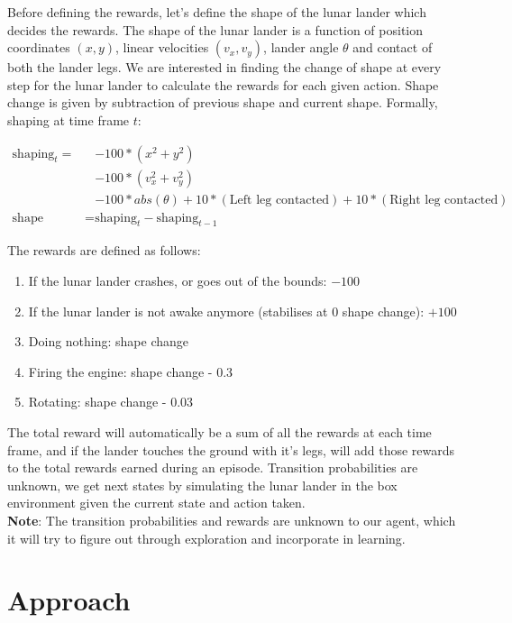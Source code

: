 \documentclass[12pt]{article}
\begin{document}
Before defining the rewards, let's define the shape of the lunar lander which decides the rewards. The shape of the lunar lander is a function of position coordinates $(x, y)$, linear velocities $(v_x, v_y)$, lander angle $\theta$ and contact of both the lander legs. We are interested in finding the change of shape at every step for the lunar lander to calculate the rewards for each given action. Shape change is given by subtraction of previous shape and current shape. Formally, shaping at time frame $t$:

\begin{align*}
\text{shaping}_{t} = &- 100*(x^2 + y^2) \\
           & - 100*(v_x^2 + v_y^2) \\
            &- 100*abs(\theta) + 10*(\text{Left leg contacted}) + 10*(\text{Right leg contacted}) \\
\text{shape change} = & \text{shaping}_t - \text{shaping}_{t-1}
\end{align*}

The rewards are defined as follows:

\begin{enumerate}
\item If the lunar lander crashes, or goes out of the bounds: $-100$
\item If the lunar lander is not awake anymore (stabilises at 0 shape change): $+100$
\item Doing nothing: shape change 
\item Firing the engine: shape change - 0.3
\item Rotating: shape change - 0.03
\end{enumerate}

The total reward will automatically be a sum of all the rewards at each time frame, and if the lander touches the ground with it's legs, will add those rewards to the total rewards earned during an episode. Transition probabilities are unknown, we get next states by simulating the lunar lander in the box environment given the current state and action taken. \\

\textbf{Note}: The transition probabilities and rewards are unknown to our agent, which it will try to figure out through exploration and incorporate in learning. 


\section{Approach}
\end{document}
